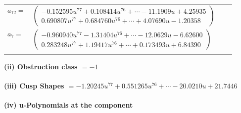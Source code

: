 \documentclass[1p]{elsarticle_modified}
\theoremstyle{definition}
\begin{document}
\begin{tabular}{m{7pt} m{180pt} m{7pt} m{180pt} }
\flushright $a_{12}=$&$\begin{pmatrix}-0.152595 u^{77}+0.108414 u^{76}+\cdots-11.1909 u+4.25935\\0.690807 u^{77}+0.684760 u^{76}+\cdots+4.07690 u-1.20358\end{pmatrix}$ \\
\flushright $a_{7}=$&$\begin{pmatrix}-0.960940 u^{77}-1.31404 u^{76}+\cdots-12.0629 u-6.62600\\0.283248 u^{77}+1.19417 u^{76}+\cdots+0.173493 u+6.84390\end{pmatrix}$\\&\end{tabular}
\flushleft \textbf{(ii) Obstruction class $= -1$}\\~\\
\flushleft \textbf{(iii) Cusp Shapes $= -1.20245 u^{77}+0.551265 u^{76}+\cdots-20.0210 u+21.7446$}\\~\\
\newpage\renewcommand{\arraystretch}{1}
\flushleft \textbf{(iv) u-Polynomials at the component}\newline \\
\end{document}
